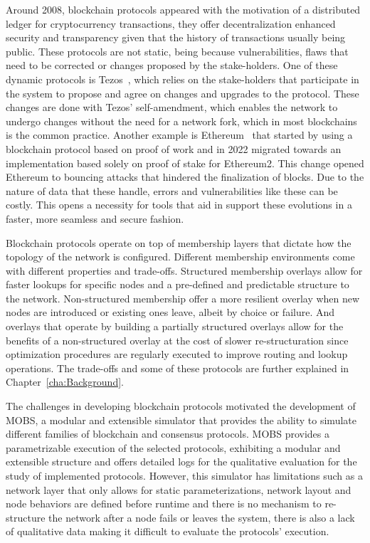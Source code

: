 Around 2008, blockchain protocols appeared with the motivation of 
a distributed ledger for cryptocurrency transactions, they offer decentralization enhanced security and transparency given that
the history of transactions usually being public. These protocols are not static, being because vulnerabilities,
flaws that need to be corrected or changes proposed by the stake-holders.
One of these dynamic protocols is Tezos~\cite{tezos}, which relies on the stake-holders that participate in the system to propose and
agree on changes and upgrades to the protocol. These changes are done with Tezos' self-amendment, which enables the network to undergo
changes without the need for a network fork, which in most blockchains is the common practice.
Another example is Ethereum~\cite{ethereum} that started by using a blockchain protocol based on proof
of work and in 2022 migrated towards an implementation based solely on proof of stake for Ethereum2. This change opened
Ethereum to bouncing attacks that hindered the finalization of blocks\cite{ethereum_analysis}.
Due to the nature of data that these handle, errors and vulnerabilities like these can be costly.
This opens a necessity for tools that aid in support these evolutions in a faster, more seamless and secure fashion.

Blockchain protocols operate on top of membership layers that dictate how the topology of the network is configured.
Different membership environments come with different properties and trade-offs. Structured membership overlays allow for faster lookups for
specific nodes and a pre-defined and predictable structure to the network. Non-structured membership offer a more resilient overlay when
new nodes are introduced or existing ones leave, albeit by choice or failure. And overlays that operate by building a partially structured
overlays allow for the benefits of a non-structured overlay at the cost of slower re-structuration since optimization
procedures are regularly executed to improve routing and lookup operations. The trade-offs and some of these protocols are further
explained in Chapter~\ref{cha:Background}.

The challenges in developing blockchain protocols motivated the development of MOBS, a modular and extensible simulator that provides
the ability to simulate different families of blockchain and consensus protocols.
MOBS provides a parametrizable execution of the selected protocols, exhibiting a modular and extensible structure and offers detailed logs for the
qualitative evaluation for the study of implemented protocols. However, this simulator has limitations such as a network layer
that only allows for static parameterizations, network layout and node behaviors are defined before runtime and there is no mechanism to
re-structure the network after a node fails or leaves the system, there is also a lack of qualitative data making it difficult to
evaluate the protocols' execution.

